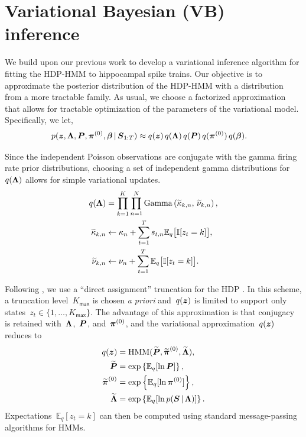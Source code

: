 \section{Variational Bayesian (VB) inference}



We build upon our previous work \citep{Chen12a,Chen14,Johnson14} to
develop a variational inference algorithm for fitting the HDP-HMM to
hippocampal spike trains. Our objective is to approximate the
posterior distribution of the HDP-HMM with a distribution from a more
tractable family. As usual, we choose a factorized approximation that
allows for tractable optimization of the parameters of the variational
model. Specifically, we let,
\begin{align*}
  p(\boldsymbol{z}, \boldsymbol{\Lambda}, \boldsymbol{P}, \boldsymbol{\pi}^{(0)}, \boldsymbol{\beta} \,|\, \boldsymbol{S}_{1:T}) 
  &\approx q(\boldsymbol{z}) \, q(\boldsymbol{\Lambda}) \, q(\boldsymbol{P}) \, q(\boldsymbol{\pi}^{(0)}) \, q(\boldsymbol{\beta}).
\end{align*}

Since the independent Poisson observations are conjugate with the
gamma firing rate prior distributions, choosing a set of independent
gamma distributions for~$q(\boldsymbol{\Lambda})$ allows for simple variational
updates.
\begin{align*}
  q(\boldsymbol{\Lambda}) &= \prod_{k=1}^K \prod_{n=1}^N \mathrm{Gamma}\left(\widetilde{\kappa}_{k,n},\, \widetilde{\nu}_{k,n} \right), \\
  \widetilde{\kappa}_{k,n} &\leftarrow \kappa_n + \sum_{t=1}^T s_{t,n} \mathbb{E}_q\big[\mathbb{I}[z_t=k]\big], \\
  \widetilde{\nu}_{k,n} &\leftarrow \nu_n + \sum_{t=1}^T \mathbb{E}_q\big[\mathbb{I}[z_t=k]\big].
\end{align*}

Following \citep{Johnson14}, we use a ``direct assignment'' truncation
for the HDP \citep{Bryant12, Liang07}. In this scheme, a truncation
level~$K_{\mathsf{max}}$ is chosen {\it a priori} and~$q(\boldsymbol{z})$ is limited to
support only states~${z_t\in\{1,\ldots, K_{\mathsf{max}}\}}$. The advantage of this
approximation is that conjugacy is retained with~$\boldsymbol{\Lambda}$,~$\boldsymbol{P}$,
and~$\boldsymbol{\pi}^{(0)}$, and the variational approximation~$q(\boldsymbol{z})$ reduces
to
\begin{align*}
q(\boldsymbol{z}) &= \mathrm{HMM}(\widetilde{\boldsymbol{P}}, \widetilde{\boldsymbol{\pi}}^{(0)}, \widetilde{\boldsymbol{\Lambda}}), \\
\widetilde{\boldsymbol{P}} &= \exp\left\{\mathbb{E}_q[\ln \boldsymbol{P}]\right\}, \\
\widetilde{\boldsymbol{\pi}}^{(0)} &= \exp\left\{\mathbb{E}_q[\ln \boldsymbol{\pi}^{(0)}]\right\}, \\
\widetilde{\boldsymbol{\Lambda}} &= \exp\left\{\mathbb{E}_q[\ln p( \boldsymbol{S} \,|\, \boldsymbol{\Lambda})]\right\}.
\end{align*}
Expectations~${\mathbb{E}_q[z_t=k]}$ can then be computed using
standard message-passing algorithms for HMMs.


